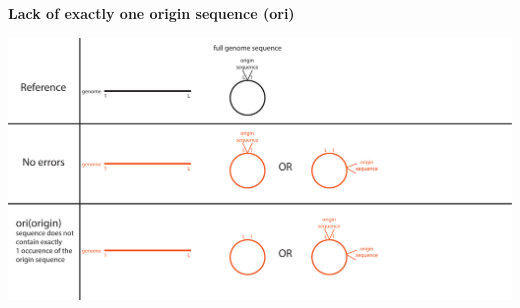 \documentclass[landscape]{slides}
\begin{document}
\begin{slide}
\begin{center}
\textbf{Lack of exactly one origin sequence (ori)}
\vspace{0.5in}

\includegraphics[width=10in]{figs/error-9-ori}
\end{center}
\vfill
\end{slide}
\end{document}
